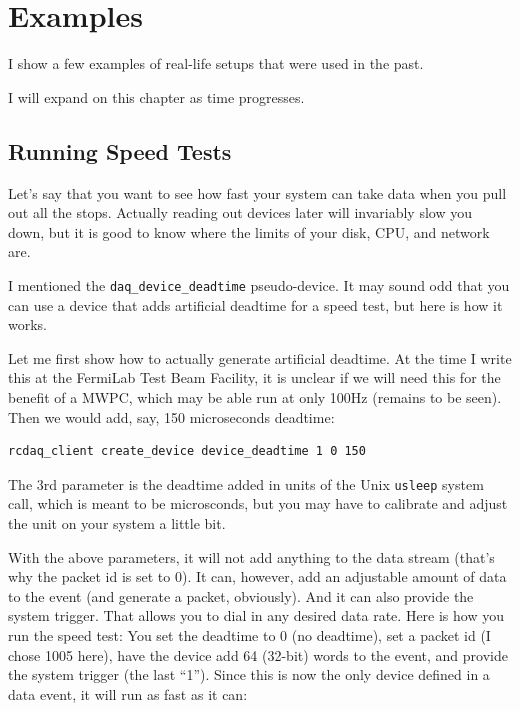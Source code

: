 \documentclass{article}[11pt]
\begin{document}
\appendix

\section{Examples}

I show a few examples of real-life setups that were used in the past.

I will expand on this chapter as time progresses.

\subsection{Running Speed Tests}
\label{speedtests}
Let's say that you want to see how fast your system can take data when
you pull out all the stops. Actually reading out devices later will
invariably slow you down, but it is good to know where the limits of
your disk, CPU, and network are.

I mentioned the \verb|daq_device_deadtime| pseudo-device. It may sound
odd that you can use a device that adds artificial deadtime for a
speed test, but here is how it works.

Let me first show how to actually generate artificial deadtime. At the
time I write this at the FermiLab Test Beam Facility, it is unclear if
we will need this for the benefit of a MWPC, which may be able run at
only 100Hz (remains to be seen). Then we would add, say, 150 microseconds
deadtime:

\begin{verbatim}
rcdaq_client create_device device_deadtime 1 0 150
\end{verbatim}

The 3rd parameter is the deadtime added in units of the Unix \verb|usleep|
system call, which is meant to be microsconds, but you may have to calibrate and 
adjust the unit on your system a little bit.  

With the above parameters, it will not add anything to the data stream
(that's why the packet id is set to 0). It can, however, add an
adjustable amount of data to the event (and generate a packet,
obviously). And it can also provide the system trigger. That allows
you to dial in any desired data rate. Here is how you run the speed
test: You set the deadtime to 0 (no deadtime), set a packet id (I chose 1005 here), 
have the device add 64 (32-bit) words to the event,  and provide the system
trigger (the last ``1''). Since this is now the only device defined in a data event,
it will run as fast as it can:
\end{document}
